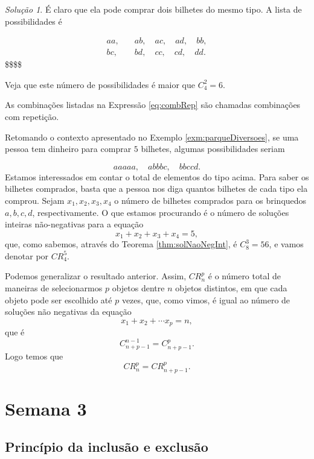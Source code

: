 \documentclass[]{book}
\theoremstyle{definition}
\theoremstyle{definition}
\theoremstyle{definition}
\theoremstyle{remark}
\newtheorem*{solution}{Solução}
\begin{document}
\begin{solution}
\iffalse{} {Solução. } \fi{}É claro que ela pode comprar dois bilhetes do mesmo tipo.
A lista de possibilidades é

\begin{align}
aa, &\quad ab, \quad ac, \quad ad, \quad bb, \\
bc, &\quad bd, \quad cc, \quad cd, \quad dd. 
\label{eq:combRep}
\end{align}
\$\$\$\$

Veja que este número de possibilidades é maior que \(C^2_4=6\).
\end{solution}

As combinações listadas na Expressão \eqref{eq:combRep} são chamadas combinações com repetição.

Retomando o contexto apresentado no Exemplo \ref{exm:parqueDiversoes}, se uma pessoa tem dinheiro para comprar \(5\) bilhetes, algumas possibilidades seriam

\[aaaaa, \quad abbbc, \quad bbccd.\]
Estamos interessados em contar o total de elementos do tipo acima.
Para saber os bilhetes comprados, basta que a pessoa nos diga quantos bilhetes de cada tipo ela comprou.
Sejam \(x_1, x_2, x_3, x_4\) o número de bilhetes comprados para os brinquedos \(a,b,c,d\), respectivamente.
O que estamos procurando é o número de soluções inteiras não-negativas para a equação
\[x_1+x_2+x_3+x_4=5,\]
que, como sabemos, através do Teorema \ref{thm:solNaoNegInt}, é \(C^3_8=56\), e vamos denotar por \(CR^5_4\).

Podemos generalizar o resultado anterior.
Assim, \(CR^p_n\) é o número total de maneiras de selecionarmos \(p\) objetos dentre \(n\) objetos distintos, em que cada objeto pode ser escolhido até \(p\) vezes, que, como vimos, é igual ao número de soluções não negativas da equação
\[x_1+x_2+\cdots x_p=n,\]
que é \[C^{n-1}_{n+p-1}=C^{p}_{n+p-1}.\]
Logo temos que
\[CR^{p}_{n}=CR^{p}_{n+p-1}.\]

\hypertarget{sem3}{%
\chapter{Semana 3}\label{sem3}}

\hypertarget{princuxedpio-da-inclusuxe3o-e-exclusuxe3o}{%
\section{Princípio da inclusão e exclusão}\label{princuxedpio-da-inclusuxe3o-e-exclusuxe3o}}
\end{document}
